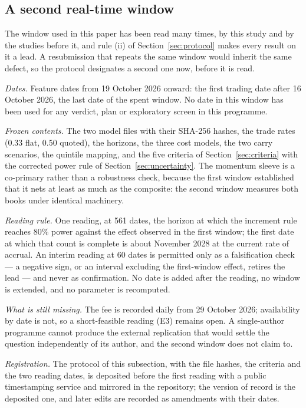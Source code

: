 \subsection{A second real-time window}\label{sec:realtime2}

The window used in this paper has been read many times, by this study and by the studies before it, and rule (ii) of Section~\ref{sec:protocol} makes every result on it a lead. A resubmission that repeats the same window would inherit the same defect, so the protocol designates a second one now, before it is read.

\emph{Dates.} Feature dates from 19 October 2026 onward: the first trading date after 16 October 2026, the last date of the spent window. No date in this window has been used for any verdict, plan or exploratory screen in this programme.

\emph{Frozen contents.} The two model files with their SHA-256 hashes, the trade rates (0.33 flat, 0.50 quoted), the horizons, the three cost models, the two carry scenarios, the quintile mapping, and the five criteria of Section~\ref{sec:criteria} with the corrected power rule of Section~\ref{sec:uncertainty}. The momentum sleeve is a co-primary rather than a robustness check, because the first window established that it nets at least as much as the composite: the second window measures both books under identical machinery.

\emph{Reading rule.} One reading, at 561 dates, the horizon at which the increment rule reaches 80\% power against the effect observed in the first window; the first date at which that count is complete is about November 2028 at the current rate of accrual. An interim reading at 60 dates is permitted only as a falsification check --- a negative sign, or an interval excluding the first-window effect, retires the lead --- and never as confirmation. No date is added after the reading, no window is extended, and no parameter is recomputed.

\emph{What is still missing.} The fee is recorded daily from 29 October 2026; availability by date is not, so a short-feasible reading (E3) remains open. A single-author programme cannot produce the external replication that would settle the question independently of its author, and the second window does not claim to.

\emph{Registration.} The protocol of this subsection, with the file hashes, the criteria and the two reading dates, is deposited before the first reading with a public timestamping service and mirrored in the repository; the version of record is the deposited one, and later edits are recorded as amendments with their dates.
